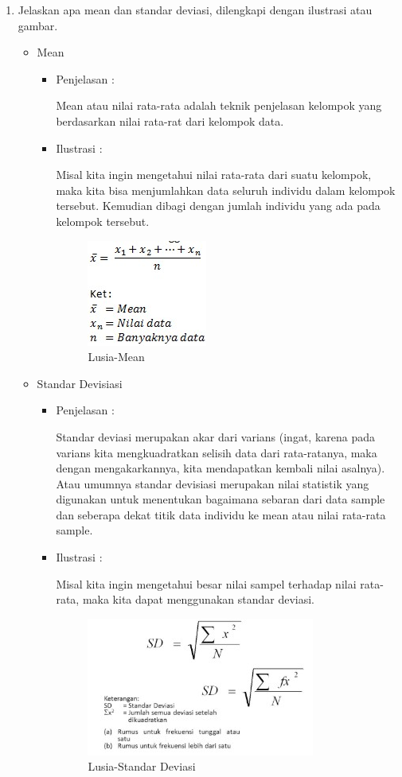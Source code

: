 \begin{enumerate}
\item Jelaskan apa mean dan standar deviasi, dilengkapi dengan ilustrasi atau gambar.
	\begin{itemize}
	\item Mean
		\begin{itemize}
		\item Penjelasan :
			\par Mean atau nilai rata-rata adalah teknik penjelasan kelompok yang berdasarkan nilai rata-rat dari kelompok data.
		\item Ilustrasi :
			\par Misal kita ingin mengetahui nilai rata-rata dari suatu kelompok, maka kita bisa menjumlahkan data seluruh individu dalam kelompok tersebut. Kemudian dibagi dengan jumlah individu yang ada pada kelompok tersebut.	
			\begin{figure}[ht]
			\centering
			\includegraphics[scale=0.5]{figures/p5a.jpg}
			\caption{Lusia-Mean}
			\label{contoh}
			\end{figure}
		\end{itemize}
	
	\item Standar Devisiasi
		\begin{itemize}
		\item Penjelasan :
			\par Standar deviasi merupakan akar dari varians (ingat, karena pada varians kita mengkuadratkan selisih data dari rata-ratanya, maka dengan mengakarkannya, kita mendapatkan kembali nilai asalnya). Atau umumnya standar devisiasi merupakan nilai statistik yang digunakan untuk menentukan bagaimana sebaran dari data sample dan seberapa dekat titik data individu ke mean atau nilai rata-rata sample.
			
		\item Ilustrasi :
			\par Misal kita ingin mengetahui besar nilai sampel terhadap nilai rata-rata, maka kita dapat menggunakan standar deviasi.
			\begin{figure}[ht]
			\centering
			\includegraphics[scale=0.5]{figures/p5b.jpg}
			\caption{Lusia-Standar Deviasi}
			\label{contoh}
			\end{figure}
		\end{itemize}
		

\end{itemize}
\end{enumerate}
